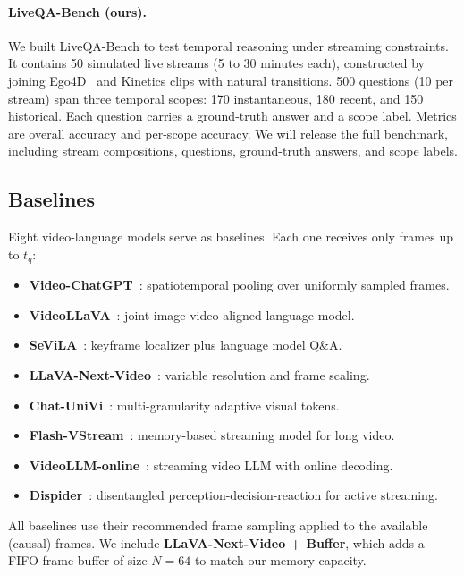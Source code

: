\paragraph{LiveQA-Bench (ours).}
We built LiveQA-Bench to test temporal reasoning under streaming constraints.
It contains 50 simulated live streams (5 to 30 minutes each), constructed by joining Ego4D~\cite{grauman2022ego4d} and Kinetics clips with natural transitions.
500 questions (10 per stream) span three temporal scopes: 170 instantaneous, 180 recent, and 150 historical. Each question carries a ground-truth answer and a scope label.
Metrics are overall accuracy and per-scope accuracy. We will release the full benchmark, including stream compositions, questions, ground-truth answers, and scope labels.

\subsection{Baselines}
\label{sec:baselines}

Eight video-language models serve as baselines. Each one receives only frames up to $t_q$:

\begin{itemize}[itemsep=2pt]
  \item \textbf{Video-ChatGPT}~\cite{maaz2023videochatgpt}: spatiotemporal pooling over uniformly sampled frames.
  \item \textbf{VideoLLaVA}~\cite{lin2023videollava}: joint image-video aligned language model.
  \item \textbf{SeViLA}~\cite{yu2023sevila}: keyframe localizer plus language model Q\&A.
  \item \textbf{LLaVA-Next-Video}~\cite{zhang2024llavanextvideo}: variable resolution and frame scaling.
  \item \textbf{Chat-UniVi}~\cite{jin2024chatunivi}: multi-granularity adaptive visual tokens.
  \item \textbf{Flash-VStream}~\cite{zhang2024flashvstream}: memory-based streaming model for long video.
  \item \textbf{VideoLLM-online}~\cite{chen2024videollmonline}: streaming video LLM with online decoding.
  \item \textbf{Dispider}~\cite{he2024dispider}: disentangled perception-decision-reaction for active streaming.
\end{itemize}

All baselines use their recommended frame sampling applied to the available (causal) frames.
We include \textbf{LLaVA-Next-Video + Buffer}, which adds a FIFO frame buffer of size $N\!=\!64$ to match our memory capacity.


